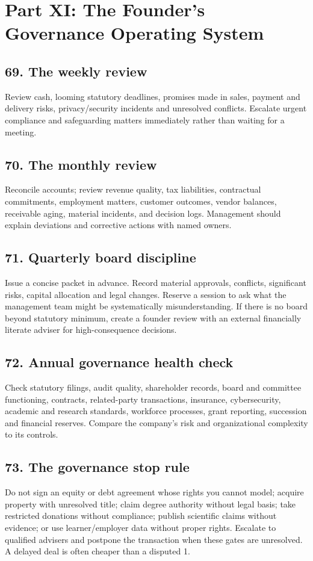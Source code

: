 \section*{Part XI: The Founder's Governance Operating System}

\subsection{69. The weekly review}

Review cash, looming statutory deadlines, promises made in sales, payment and delivery risks, privacy/security incidents and unresolved conflicts. Escalate urgent compliance and safeguarding matters immediately rather than waiting for a meeting.

\subsection{70. The monthly review}

Reconcile accounts; review revenue quality, tax liabilities, contractual commitments, employment matters, customer outcomes, vendor balances, receivable aging, material incidents, and decision logs. Management should explain deviations and corrective actions with named owners.

\subsection{71. Quarterly board discipline}

Issue a concise packet in advance. Record material approvals, conflicts, significant risks, capital allocation and legal changes. Reserve a session to ask what the management team might be systematically misunderstanding. If there is no board beyond statutory minimum, create a founder review with an external financially literate adviser for high-consequence decisions.

\subsection{72. Annual governance health check}

Check statutory filings, audit quality, shareholder records, board and committee functioning, contracts, related-party transactions, insurance, cybersecurity, academic and research standards, workforce processes, grant reporting, succession and financial reserves. Compare the company's risk and organizational complexity to its controls.

\subsection{73. The governance stop rule}

Do not sign an equity or debt agreement whose rights you cannot model; acquire property with unresolved title; claim degree authority without legal basis; take restricted donations without compliance; publish scientific claims without evidence; or use learner/employer data without proper rights. Escalate to qualified advisers and postpone the transaction when these gates are unresolved. A delayed deal is often cheaper than a disputed 1.
